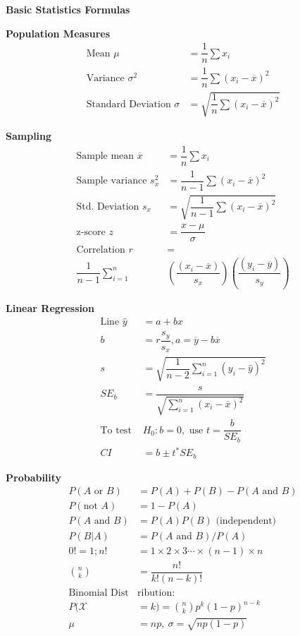 \documentclass[10pt,letterpaper, landscape]{article}
\begin{document}
\thispagestyle{empty}
\setlength{\parindent}{0pt}
\setlength{\columnseprule}{0.4pt}
\setlength{\columnsep}{3ex}

{\LARGE \begin{center}
\textbf{Basic Statistics  Formulas}
\end{center}}
\begin{multicols}{3}
{\large \textbf{Population Measures}}
\begin{align}
\text{Mean } \mu &= \dfrac{1}{n}\sum x_i\\
\text{Variance } \sigma^2 &= \dfrac{1}{n}\sum(x_i-\overline{x})^2\\
\text{Standard Deviation } \sigma&=\sqrt{\dfrac{1}{n}\sum(x_i-\overline{x})^2}
\end{align}
\hrulefill

{\large \textbf{Sampling}}
\begin{align}
\text{Sample mean } \overline{x} &= \dfrac{1}{n}\sum x_i\\
\text{Sample variance } s_x^2 &= \dfrac{1}{n-1}\sum(x_i-\overline{x})^2\\
\text{Std. Deviation } s_x&=\sqrt{\dfrac{1}{n-1}\sum(x_i-\overline{x})^2}\\
\text{z-score }z&=\dfrac{x-\mu}{\sigma}\\
\text{Correlation }r&=\nonumber \\
\dfrac{1}{n-1}\sum_{i=1}^n &\left(\dfrac{(x_i-\overline{x})}{s_x} \right) \left(\dfrac{(y_i-\overline{y})}{s_y} \right)
\end{align}

\hrulefill

{\large \textbf{Linear Regression}}
\begin{align}
\text{Line } \hat{y}&=a+bx \\
b&=r\dfrac{s_y}{s_x}, 
a=\overline{y}-b\overline{x}  \\
s &=\sqrt{\dfrac{1}{n-2}{\sum_{i=1}^n(y_i-\hat{y})^2}}\\
SE_b &=\dfrac{s}{\sqrt{\displaystyle{\sum_{i=1}^n\left (x_i-\overline{x}\right )^2}}}\\
\text{To test } & H_0:b=0, \text{ use }t = \dfrac{b}{SE_b} \\
CI &= b \pm t^* SE_b
\end{align}



{\large \textbf{Probability}}
\begin{align}
P(A\text{ or } B)&=P(A)+P(B)-P(A\text{ and }B)\\
P(\text{not }A)&=1-P(A)\\
P(A\text{ and }B)&=P(A)P(B)\text{ (independent)} \\
P(B|A)&=P(A\text{ and } B)/{P(A)}\\
0!=1; 
n! &= 1\times 2 \times 3 \cdots \times (n-1)\times n\\
\binom{n}{k}&=\dfrac{n!}{k!(n-k)!}\\
\text{Binomial Dist}&\text{ribution}:\nonumber\\
P(\mathcal{X}&=k)=\binom{n}{k}p^k(1-p)^{n-k}\\
\mu&=np, \ \sigma = \sqrt{np(1-p)}
\end{align}





\end{multicols}
\end{document}
